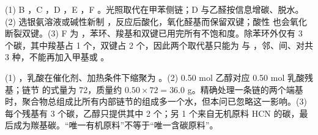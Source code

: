 \begin{jiexilist}
\item (1) B ，C ，D ，E ，F 。光照取代在甲苯侧链；D 与乙醛按信息增碳、脱水。(2) 选银氨溶液或碱性新制 ，反应后酸化，氧化醛基而保留双键；酸性  也会氧化断裂双键。(3) F 为 ，苯环、羧基和双键已用完所有不饱和度。除苯环外仅有 3 个碳，其中羧基占 1 个，双键占 2 个，因此两个取代基只能为  与 ，邻、间、对共 3 种，不能再加入甲基或 。
\item (1) ，乳酸在催化剂、加热条件下缩聚为 。(2) 0.50 mol 乙醇对应 0.50 mol 乳酸残基；链节  的式量为 72，质量约 $0.50\times72=36.0$ g。精确处理一条链的两个端基时，聚合物总组成比所有内部链节的组成多一个水，但本问已忽略这一影响。(3) 每个残基有 3 个碳，乙醇只提供其中 2 个；另 1 个来自无机原料 HCN 的碳，最后成为羰基碳。“唯一有机原料”不等于“唯一含碳原料”。
\end{jiexilist}
